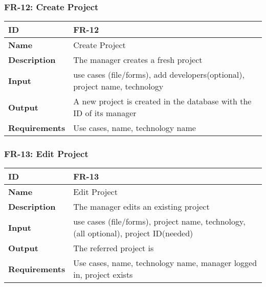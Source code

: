 \subsubsection{FR-12: Create Project}
\begin{center}
  \begin{tabularx}{\textwidth}{|l|X|}
      \hline
      \textbf{ID} & FR-12 \\
      \hline
      \textbf{Name} & Create Project \\
      \hline
      \textbf{Description} & The manager creates a fresh project \\
      \hline
      \textbf{Input} & use cases (file/forms), add developers(optional), project name, technology \\
      \hline
      \textbf{Output} & A new project is created in the database with the ID of its manager \\
      \hline
      \textbf{Requirements} & Use cases, name, technology name \\
      \hline
  \end{tabularx}
\end{center}

\subsubsection{FR-13: Edit Project}
\begin{center}
  \begin{tabularx}{\textwidth}{|l|X|}
      \hline
      \textbf{ID} & FR-13 \\
      \hline
      \textbf{Name} & Edit Project \\
      \hline
      \textbf{Description} & The manager edits an existing project \\
      \hline
      \textbf{Input} & use cases (file/forms), project name, technology, (all optional), project ID(needed) \\
      \hline
      \textbf{Output} & The referred project is  \\
      \hline
      \textbf{Requirements} & Use cases, name, technology name, manager logged in, project exists \\
      \hline
  \end{tabularx}
\end{center}

